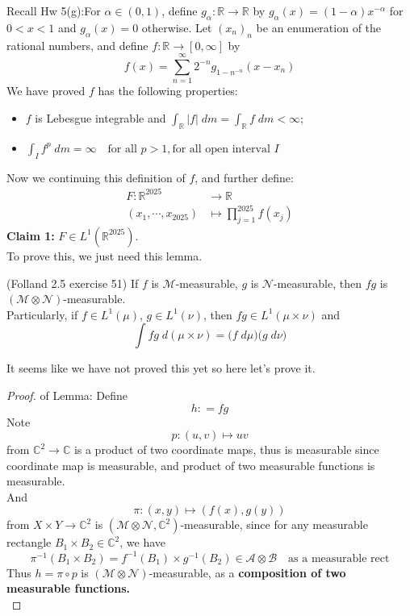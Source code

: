 \documentclass[lang=cn,11pt]{elegantbook}
\begin{document}
\begin{solution}
Recall Hw 5(g):For $\alpha\in(0,1)$, define $g_\alpha\colon \mathbb{R}\to \mathbb{R}$ by $g_\alpha(x)=(1-\alpha)x^{-\alpha}$ for $0<x<1$ and $g_\alpha(x)=0$ otherwise. Let $(x_n)_n$ be an enumeration of the rational numbers, and define $f\colon \mathbb{R}\to[0,\infty]$ by \[
    f(x)=\sum_{n=1}^\infty2^{-n}g_{1-n^{-n}}(x-x_n)
  \]
We have proved $f$ has the following properties:
\begin{itemize}
    \item $f$ is Lebesgue integrable and $\int_\mathbb{R} |f|\; d m = \int_\mathbb{R} f\; d m<\infty$;
    \item \(\int_I f^p\; d m=\infty \quad \text{for all }p >1, \text{for all open interval } I\)
\end{itemize}
Now we continuing this definition of $f$, and further define:\begin{align*}
    F: \mathbb{R}^{2025} &\to \mathbb{R} \\
(x_1,\cdots, x_{2025})    &\mapsto \prod_{j=1}^{2025} f(x_j)
\end{align*}
\textbf{Claim 1: }$F \in L^1(\mathbb{R}^{2025})$.\\
To prove this, we just need this lemma.
\begin{lemma}{(Folland 2.5 exercise 51)}
If $f$ is $\mathcal{M}$-measurable, $g$ is $\mathcal{N}$-measurable, then $fg$ is $(\mathcal{M}\otimes \mathcal{N})$-measurable.\\
Particularly, if $f \in L^1(\mu)$, $g \in L^1 (\nu)$, then $fg \in L^1(\mu \times \nu)$ and \[
\int fg \; d(\mu\times \nu) = \bigg(f \; d\mu \bigg) \bigg( g \; d\nu \bigg)
\]
\end{lemma}
It seems like we have not proved this yet so here let's prove it.
\begin{proof}
    of Lemma: Define \[
    h : = fg
    \]
Note \[
   p:  (u,v) \mapsto uv
    \]
from $\mathbb{C}^2\to \mathbb{C}$ is a product of two coordinate maps, thus is measurable since coordinate map is measurable, and product of two measurable functions is measurable. \\
And \[
\pi:    (x,y)\mapsto (f(x),g(y))
    \] from $X\times  Y\to \mathbb{C}^2$ is $(\mathcal{M}\otimes \mathcal{N},\mathbb{C}^2)$-measurable, since for any measurable rectangle $B_1 \times B_2 \in \mathbb{C}^2$, we have \[
    \pi^{-1}(B_1 \times B_2)  = f^{-1}(B_1) \times g^{-1}(B_2) \in \mathcal{A}\otimes \mathcal{B} \quad  \text{as a measurable rect}
    \]
    Thus $h = \pi \circ p$ is $(\mathcal{M}\otimes \mathcal{N})$-measurable, as a \textbf{composition of two measurable functions.} \\

\end{proof}
\end{solution}
\end{document}
